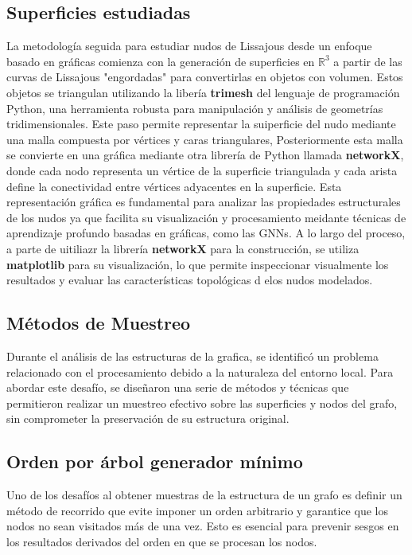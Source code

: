 \subsection{Superficies estudiadas}
La metodología seguida para estudiar nudos de Lissajous desde un enfoque basado en gráficas comienza con la generación de superficies en $\mathbb{R}^3$ a partir de las curvas de Lissajous "engordadas" para convertirlas en objetos con volumen. Estos objetos se triangulan utilizando la libería \textbf{trimesh} del lenguaje de programación Python, una herramienta robusta para manipulación y análisis de geometrías tridimensionales. Este paso permite representar la suiperficie del nudo mediante una malla compuesta por vértices y caras triangulares, Posteriormente esta malla se convierte en una gráfica mediante otra librería de Python llamada \textbf{networkX}, donde cada nodo representa  un vértice de la superficie triangulada y cada arista define la conectividad entre vértices adyacentes en la superficie. Esta representación gráfica es fundamental para analizar las propiedades estructurales de los nudos ya que facilita su visualización y procesamiento meidante técnicas de aprendizaje profundo basadas en gráficas, como las GNNs. A lo largo del proceso,  a parte de uitiliazr la librería \textbf{networkX} para la construcción, se utiliza \textbf{matplotlib} para su visualización, lo que permite inspeccionar visualmente los resultados y evaluar las características topológicas d elos nudos modelados.

\subsection{Métodos de Muestreo}

Durante el análisis de las estructuras de la grafica, se identificó un problema relacionado con el procesamiento debido a la naturaleza del entorno local. Para abordar este desafío, se diseñaron una serie de métodos y técnicas que permitieron realizar un muestreo efectivo sobre las superficies y nodos del grafo, sin comprometer la preservación de su estructura original.

\subsection{Orden por árbol generador mínimo}
Uno de los desafíos al obtener muestras de la estructura de un grafo es definir un método de recorrido que evite imponer un orden arbitrario y garantice que los nodos no sean visitados más de una vez. Esto es esencial para prevenir sesgos en los resultados derivados del orden en que se procesan los nodos.

